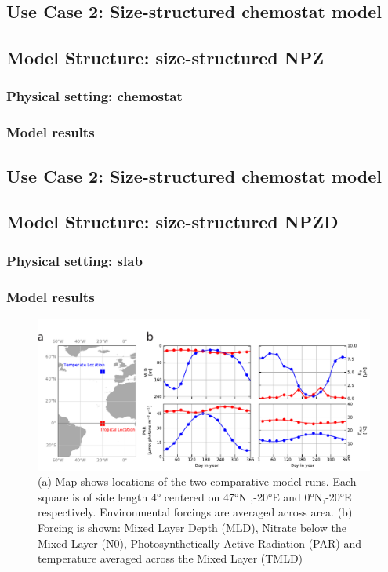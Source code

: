 \documentclass[journal abbreviation, manuscript]{copernicus}
\begin{document}
\subsection{Use Case 2: Size-structured chemostat model}


\subsection{Model Structure: size-structured NPZ}

\subsubsection{Physical setting: chemostat}


\subsubsection{Model results}


\subsection{Use Case 2: Size-structured chemostat model}

\subsection{Model Structure: size-structured NPZD}



\subsubsection{Physical setting: slab}

\subsubsection{Model results}


\clearpage

\begin{figure}[t]
\includegraphics[width=15cm]{Figures/firstdraft_plots/01_forcing_labeled.pdf}
\caption{(a) Map shows locations of the two comparative model runs. Each square is of side length 4° centered on 47°N ,-20°E and 0°N,-20°E respectively. Environmental forcings are averaged across area. (b) Forcing is shown: Mixed Layer Depth (MLD), Nitrate below the Mixed Layer (N0),
Photosynthetically Active Radiation (PAR) and temperature averaged across the Mixed Layer (TMLD)}
\label{phydraforcing}
\end{figure}
\end{document}

